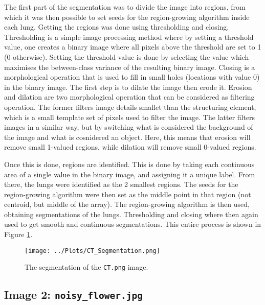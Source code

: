 \documentclass[12pt]{report} %
\begin{document}
The first part of the segmentation was to divide the image into regions, from which it was then possible to set seeds for the region-growing algorithm inside each lung. Getting the regions was done using thresholding and closing. Thresholding is a simple image processing method where by setting a threshold value, one creates a binary image where all pixels above the threshold are set to 1 (0 otherwise)\cite[p.743]{gonzalez2002digital}. Setting the threshold value is done by selecting the value which maximises the between-class variance of the resulting binary image\cite[pp. 747-751]{gonzalez2002digital}. Closing is a morphological operation that is used to fill in small holes (locations with value 0) in the binary image. The first step is to dilate the image then erode it\cite[pp.645-648]{gonzalez2002digital}. Erosion and dilation are two morphological operation that can be considered as filtering operation. The former filters image details smallet than the structuring element, which is a small template set of pixels used to filter the image\cite[pp. 636-638]{gonzalez2002digital}. The latter filters images in a similar way, but by switching what is considered the background of the image and what is cosnidered an object. Here, this means that erosion will remove small 1-valued regions, while dilation will remove small 0-valued regions.

Once this is done, regions are identified. This is done by taking each continuous area of a single value in the binary image, and assigning it a unique label\cite{skimage_measure_label}. From there, the lungs were identified as the 2 smallest regions. The seeds for the region-growing algorithm were then set as the middle point in that region (not centroid, but middle of the array). The region-growing algorithm is then used, obtaining segmentations of the lungs. Thresholding and closing where then again used to get smooth and continuous segmentations. This entire process is shown in Figure \ref{fig:ct_segmentation}.

\begin{figure}[htbp]
    \centering
    \texttt{[image: ../Plots/CT\_Segmentation.png]}
    \caption{The segmentation of the \texttt{CT.png} image.}
    \label{fig:ct_segmentation}
\end{figure}

\subsection{Image 2: \texttt{noisy\_flower.jpg}}
\end{document}
